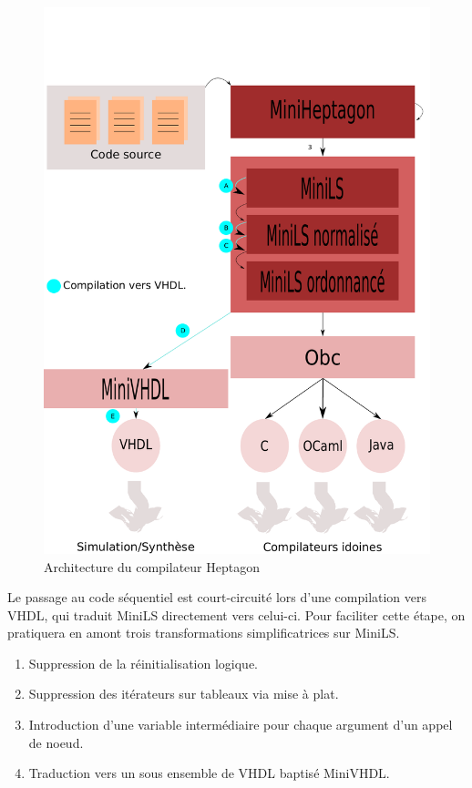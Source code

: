 \documentclass[9pt,a4paper]{article}
\newcommand{\LANG}{Heptagon}
\begin{document}
\begin{figure}[htp]
  \centering
  \includegraphics[scale=0.5]{archi}
  \caption{Architecture du compilateur \LANG{}}
  \label{fig:archi}
\end{figure}

Le passage au code séquentiel est court-circuité lors d'une compilation vers
VHDL, qui traduit MiniLS directement vers celui-ci. Pour faciliter cette étape,
on pratiquera en amont trois transformations simplificatrices sur MiniLS.

\renewcommand{\labelenumi}{\Alph{enumi}}
\begin{enumerate}
\item Suppression de la réinitialisation logique.
\item Suppression des itérateurs sur tableaux via mise à plat.
\item Introduction d'une variable intermédiaire pour chaque argument d'un appel
  de noeud.
\item Traduction vers un sous ensemble de VHDL baptisé MiniVHDL.
\end{enumerate}
\end{document}

